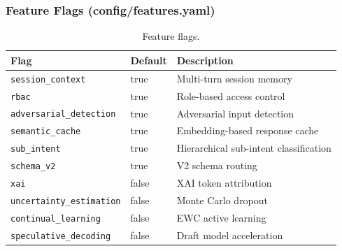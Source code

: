 ﻿\documentclass[10pt,journal,onecolumn]{IEEEtran}
\begin{document}
\subsubsection{Feature Flags (config/features.yaml)}
\begin{table}[h]
\caption{Feature flags.}
\label{tab:flags}
\begin{tabularx}{\columnwidth}{>{\ttfamily}l >{\ttfamily}l X}
\toprule
\textbf{Flag} & \textbf{Default} & \textbf{Description}\\
\midrule
\texttt{session\_context} & true & Multi-turn session memory\\
\texttt{rbac} & true & Role-based access control\\
\texttt{adversarial\_detection} & true & Adversarial input detection\\
\texttt{semantic\_cache} & true & Embedding-based response cache\\
\texttt{sub\_intent} & true & Hierarchical sub-intent classification\\
\texttt{schema\_v2} & true & V2 schema routing\\
\texttt{xai} & false & XAI token attribution\\
\texttt{uncertainty\_estimation} & false & Monte Carlo dropout\\
\texttt{continual\_learning} & false & EWC active learning\\
\texttt{speculative\_decoding} & false & Draft model acceleration\\
\bottomrule
\end{tabularx}
\end{table}

\appendices
\end{document}
